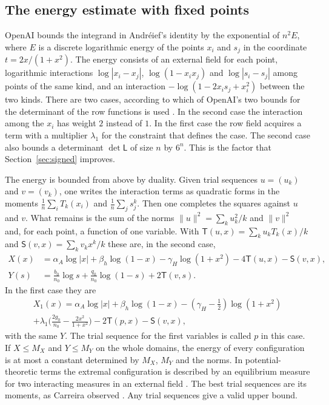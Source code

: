\subsection{The energy estimate with fixed points}\label{ssec:energy}
OpenAI bounds the integrand in Andr\'eief's identity by the exponential of $n^2E$, where $E$ is a discrete
logarithmic energy of the points $x_i$ and $s_j$ in the coordinate $t=2x/(1+x^2)$. The energy consists of an
external field for each point, logarithmic interactions $\log|x_i-x_j|$, $\log(1-x_ix_j)$ and
$\log|s_i-s_j|$ among points of the same kind, and an interaction $-\log(1-2x_is_j+x_i^2)$ between the two
kinds. There are two cases, according to which of OpenAI's two bounds for the determinant of the row
functions is used \cite[Props.~5.2, 5.3]{OpenAI2026}. In the second case the interaction among the $x_i$ has
weight $2$ instead of $1$. In the first case the row field acquires a term with a multiplier $\lambda_1$ for
the constraint that defines the case. The second case also bounds a determinant $\det\mathsf L$ of size $n$
by $6^n$. This is the factor that Section~\ref{sec:signed} improves.

The energy is bounded from above by duality. Given trial sequences $u=(u_k)$ and $v=(v_k)$, one writes the
interaction terms as quadratic forms in the moments $\frac1n\sum_iT_k(x_i)$ and $\frac1n\sum_js_j^k$. Then one
completes the squares against $u$ and $v$. What remains is the sum of the norms $\|u\|^2=\sum_ku_k^2/k$ and
$\|v\|^2$ and, for each point, a function of one variable. With $\mathsf T(u,x)=\sum_ku_kT_k(x)/k$ and
$\mathsf S(v,x)=\sum_kv_kx^k/k$ these are, in the second case,
\begin{align*}
 X(x)&=\alpha_A\log|x|+\beta_h\log(1-x)-\gamma_H\log(1+x^2)-4\mathsf T(u,x)-\mathsf S(v,x),\\
 Y(s)&=\tfrac{b_0}{n_0}\log s+\tfrac{q_0}{n_0}\log(1-s)+2\mathsf T(v,s).
\end{align*}
In the first case they are
\begin{multline*}
 X_1(x)=\alpha_A\log|x|+\beta_h\log(1-x)-(\gamma_H-\tfrac12)\log(1+x^2)\\
 +\lambda_1\bigl(\tfrac{2g_0}{n_0}-\tfrac{2x^2}{1+x^2}\bigr)-2\mathsf T(p,x)-\mathsf S(v,x),
\end{multline*}
with the same $Y$. The trial sequence for the first variables is called $p$ in this case. If $X\le M_X$ and
$Y\le M_Y$ on the whole domains, the energy of every configuration is at most a constant determined by $M_X$,
$M_Y$ and the norms. In potential-theoretic terms the extremal configuration is described by an equilibrium
measure for two interacting measures in an external field \cite{SaffTotik}. The best trial sequences are its
moments, as Carreira observed \cite{Carreira2026}. Any trial sequences give a valid upper bound.

